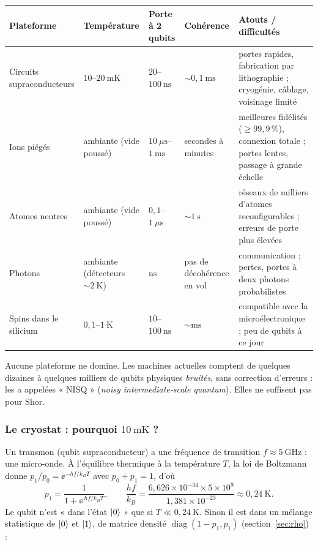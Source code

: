 \begin{center}
\renewcommand{\arraystretch}{1.2}
\small
\begin{tabular}{@{}>{\raggedright\arraybackslash}p{2.7cm}>{\raggedright\arraybackslash}p{2.2cm}>{\raggedright\arraybackslash}p{1.9cm}>{\raggedright\arraybackslash}p{1.9cm}>{\raggedright\arraybackslash}p{5.5cm}@{}}
\toprule
\textbf{Plateforme} & \textbf{Température} & \textbf{Porte à 2 qubits} & \textbf{Cohérence} & \textbf{Atouts / difficultés}\\
\midrule
Circuits supra\-conducteurs \parencite{kjaergaard2020} & $10$--$20\ \mathrm{mK}$ & $20$--$100\ \mathrm{ns}$ & $\sim0{,}1\ \mathrm{ms}$ & portes rapides, fabrication par lithographie ; cryogénie, câblage, voisinage limité\\
Ions piégés \parencite{bruzewicz2019} & ambiante (vide poussé) & $10\ \mu\mathrm{s}$--$1\ \mathrm{ms}$ & secondes à minutes & meilleures fidélités ($\geq99{,}9\,\%$), connexion totale ; portes lentes, passage à grande échelle\\
Atomes neutres \parencite{saffman2016} & ambiante (vide poussé) & $0{,}1$--$1\ \mu\mathrm{s}$ & $\sim1\ \mathrm{s}$ & réseaux de milliers d'atomes reconfigurables ; erreurs de porte plus élevées\\
Photons \parencite{kok2007} & ambiante (détecteurs $\sim2\ \mathrm{K}$) & $\mathrm{ns}$ & pas de décohérence en vol & communication ; pertes, portes à deux photons probabilistes\\
Spins dans le silicium \parencite{burkard2023} & $0{,}1$--$1\ \mathrm{K}$ & $10$--$100\ \mathrm{ns}$ & $\sim\mathrm{ms}$ & compatible avec la microélectronique ; peu de qubits à ce jour\\
\bottomrule
\end{tabular}
\end{center}

Aucune plateforme ne domine. Les machines actuelles comptent de quelques dizaines à quelques milliers de qubits physiques
\emph{bruités}, sans correction d'erreurs : \textcite{preskill2018} les a appelées « NISQ » (\emph{noisy intermediate-scale quantum}). Elles ne suffisent pas pour Shor.

\subsubsection{Le cryostat : pourquoi $10\ \mathrm{mK}$ ?}

Un transmon (qubit supraconducteur) a une fréquence de transition $f\approx5\ \mathrm{GHz}$ : une micro-onde. À l'équilibre thermique
à la température $T$, la loi de Boltzmann donne $p_1/p_0=\ee^{-hf/k_BT}$ avec $p_0+p_1=1$, d'où
\[
  p_1=\frac{1}{1+\ee^{\,hf/k_BT}},\qquad
  \frac{hf}{k_B}=\frac{6{,}626\times10^{-34}\times5\times10^{9}}{1{,}381\times10^{-23}}\approx0{,}24\ \mathrm{K}.
\]
Le qubit n'est « dans l'état $|0\rangle$ » que si $T\ll0{,}24\ \mathrm{K}$. Sinon il est dans un mélange statistique de
$|0\rangle$ et $|1\rangle$, de matrice densité $\operatorname{diag}(1-p_1,p_1)$ (section~\ref{sec:rho}) :

